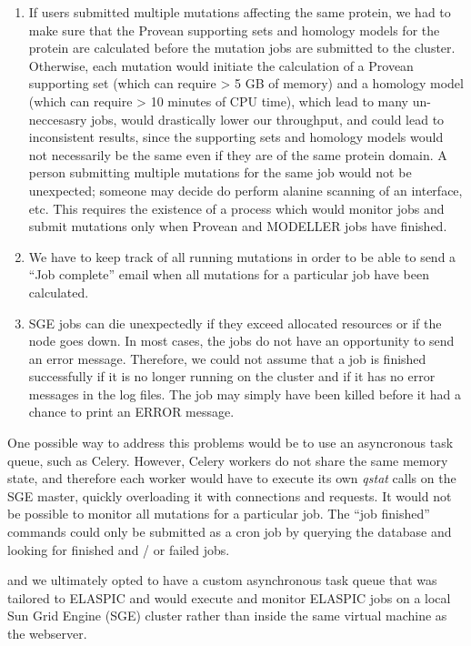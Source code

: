 \begin{enumerate}

	\item If users submitted multiple mutations affecting the same protein, we had to make sure that the Provean supporting sets and homology models for the protein are calculated before the mutation jobs are submitted to the cluster. Otherwise, each mutation would initiate the calculation of a Provean supporting set (which can require > 5 GB of memory) and a homology model (which can require > 10 minutes of CPU time), which lead to many un-neccesasry jobs, would drastically lower our throughput, and could lead to inconsistent results, since the supporting sets and homology models would not necessarily be the same even if they are of the same protein domain. A person submitting multiple mutations for the same job would not be unexpected; someone may decide do perform alanine scanning of an interface, etc. This requires the existence of a process which would monitor jobs and submit mutations only when Provean and MODELLER jobs have finished.

	\item We have to keep track of all running mutations in order to be able to send a ``Job complete'' email when all mutations for a particular job have been calculated.

	\item SGE jobs can die unexpectedly if they exceed allocated resources or if the node goes down. In most cases, the jobs do not have an opportunity to send an error message. Therefore, we could not assume that a job is finished successfully if it is no longer running on the cluster and if it has no error messages in the log files. The job may simply have been killed before it had a chance to print an ERROR message.

\end{enumerate}

One possible way to address this problems would be to use an asyncronous task queue, such as Celery. However, Celery workers do not share the same memory state, and therefore each worker would have to execute its own \textit{qstat} calls on the SGE master, quickly overloading it with connections and requests. It would not be possible to monitor all mutations for a particular job. The ``job finished'' commands could only be submitted as a cron job by querying the database and looking for finished and / or failed jobs.

and we ultimately opted to have a custom asynchronous task queue that was tailored to ELASPIC and would execute and monitor ELASPIC jobs on a local Sun Grid Engine (SGE) cluster rather than inside the same virtual machine as the webserver.

